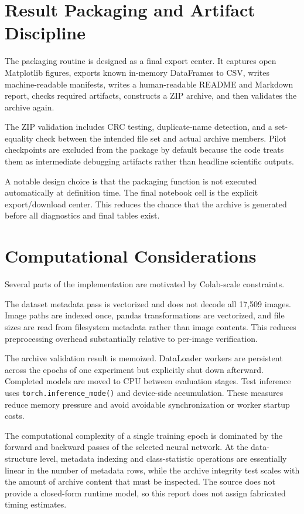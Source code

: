 \documentclass[11pt,a4paper]{article}
\begin{document}
\section{Result Packaging and Artifact Discipline}
The packaging routine is designed as a final export center. It captures open Matplotlib figures, exports known in-memory DataFrames to CSV, writes machine-readable manifests, writes a human-readable README and Markdown report, checks required artifacts, constructs a ZIP archive, and then validates the archive again.

The ZIP validation includes CRC testing, duplicate-name detection, and a set-equality check between the intended file set and actual archive members. Pilot checkpoints are excluded from the package by default because the code treats them as intermediate debugging artifacts rather than headline scientific outputs.

A notable design choice is that the packaging function is not executed automatically at definition time. The final notebook cell is the explicit export/download center. This reduces the chance that the archive is generated before all diagnostics and final tables exist.

\section{Computational Considerations}
Several parts of the implementation are motivated by Colab-scale constraints.

The dataset metadata pass is vectorized and does not decode all 17,509 images. Image paths are indexed once, pandas transformations are vectorized, and file sizes are read from filesystem metadata rather than image contents. This reduces preprocessing overhead substantially relative to per-image verification.

The archive validation result is memoized. DataLoader workers are persistent across the epochs of one experiment but explicitly shut down afterward. Completed models are moved to CPU between evaluation stages. Test inference uses \texttt{torch.inference\_mode()} and device-side accumulation. These measures reduce memory pressure and avoid avoidable synchronization or worker startup costs.

The computational complexity of a single training epoch is dominated by the forward and backward passes of the selected neural network. At the data-structure level, metadata indexing and class-statistic operations are essentially linear in the number of metadata rows, while the archive integrity test scales with the amount of archive content that must be inspected. The source does not provide a closed-form runtime model, so this report does not assign fabricated timing estimates.
\end{document}
